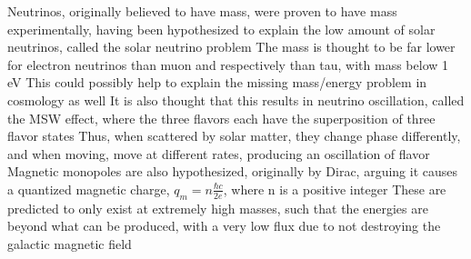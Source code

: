 \documentclass[11 pt, twoside]{article}
\newenvironment{outline*}
{
	\begin{outline}[enumerate]
	}
	{\end{outline}
}
\begin{document}
\begin{outline*}
	\2 Neutrinos, originally believed to have mass, were proven to have mass experimentally, having been hypothesized to explain the low amount of solar neutrinos, called the solar neutrino problem
		\3 The mass is thought to be far lower for electron neutrinos than muon and respectively than tau, with mass below 1 eV
		\3 This could possibly help to explain the missing mass/energy problem in cosmology as well
		\3 It is also thought that this results in neutrino oscillation, called the MSW effect, where the three flavors each have the superposition of three flavor states
			\4 Thus, when scattered by solar matter, they change phase differently, and when moving, move at different rates, producing an oscillation of flavor
	\2 Magnetic monopoles are also hypothesized, originally by Dirac, arguing it causes a quantized magnetic charge, $q_m = n\frac{\hbar c}{2e}$, where n is a positive integer
		\3 These are predicted to only exist at extremely high masses, such that the energies are beyond what can be produced, with a very low flux due to not destroying the galactic magnetic field
\end{outline*}
\end{document}
